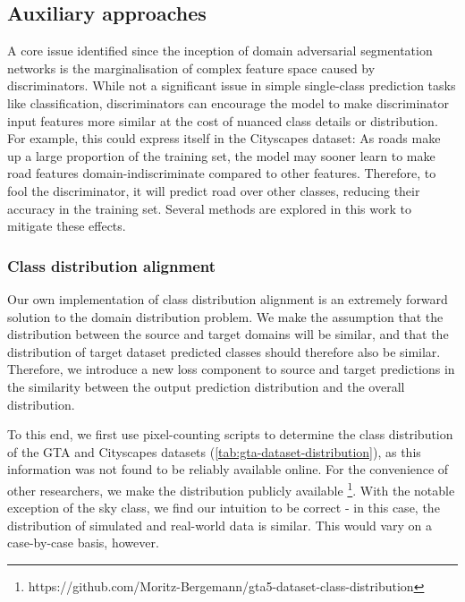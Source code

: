 \documentclass[a4paper,12pt]{report}
\begin{document}
\subsection{Auxiliary approaches}
A core issue identified since the inception of domain adversarial segmentation networks \cite{hoffman_fcns_2016} is the marginalisation of complex feature space caused by discriminators. While not a significant issue in simple single-class prediction tasks like classification, discriminators can encourage the model to make discriminator input features more similar at the cost of nuanced class details or distribution. For example, this could express itself in the Cityscapes dataset: As roads make up a large proportion of the training set, the model may sooner learn to make road features domain-indiscriminate compared to other features. Therefore, to fool the discriminator, it will predict road over other classes, reducing their accuracy in the training set. Several methods are explored in this work to mitigate these effects.

\subsubsection{Class distribution alignment}
Our own implementation of class distribution alignment is an extremely forward solution to the domain distribution problem. We make the assumption that the distribution between the source and target domains will be similar, and that the distribution of target dataset predicted classes should therefore also be similar. Therefore, we introduce a new loss component to source and target predictions in the similarity between the output prediction distribution and the overall distribution.

To this end, we first use pixel-counting scripts to determine the class distribution of the GTA and Cityscapes datasets (\autoref{tab:gta-dataset-distribution}), as this information was not found to be reliably available online. For the convenience of other researchers, we make the distribution publicly available \footnote{https://github.com/Moritz-Bergemann/gta5-dataset-class-distribution}. With the notable exception of the sky class, we find our intuition to be correct - in this case, the distribution of simulated and real-world data is similar. This would vary on a case-by-case basis, however.
\end{document}
